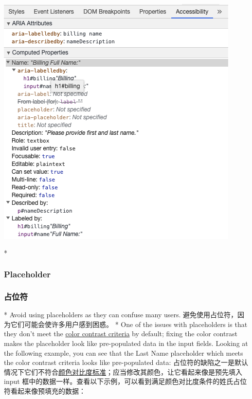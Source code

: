 \begin{center} 
\includegraphics{./img/AccessibleARIAdescribedby.659c43af.png} 
\end{center}
    

\begin{paracol}{2} 
  
\switchcolumn[0]*%
\subsubsection{Placeholder}
\switchcolumn
\subsubsection{占位符}
\switchcolumn[0]*%
Avoid using placeholders as they can confuse many users.
\switchcolumn
避免使用占位符，因为它们可能会使许多用户感到困惑。
\switchcolumn[0]*%
One of the issues with placeholders is that they don't meet the
\href{https://www.w3.org/WAI/WCAG21/Understanding/contrast-minimum.html}{color
contrast criteria} by default; fixing the color contrast makes the
placeholder look like pre-populated data in the input fields. Looking at
the following example, you can see that the Last Name placeholder which
meets the color contrast criteria looks like pre-populated data:
\switchcolumn
占位符的缺陷之一是默认情况下它们不符合\href{https://www.w3.org/WAI/WCAG21/Understanding/contrast-minimum.html}{颜色对比度标准}；应当修改其颜色，让它看起来像是预先填入
input
框中的数据一样。查看以下示例，可以看到满足颜色对比度条件的姓氏占位符看起来像预填充的数据：
\end{paracol}

